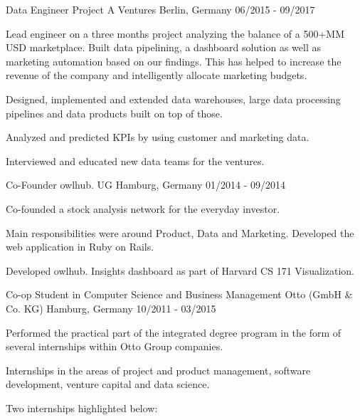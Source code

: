 \begin{cventries}
  \cventry
    {Data Engineer} %
    {Project A Ventures} %
    {Berlin, Germany} %
    {06/2015 - 09/2017} %
    {
      \begin{cvitems} %
        \item {Lead engineer on a three months project analyzing the balance of a 500+MM USD marketplace. Built data pipelining, a dashboard solution as well as marketing automation based on our findings. This has helped to increase the revenue of the company and intelligently allocate marketing budgets.}
        \item {Designed, implemented and extended data warehouses, large data processing pipelines and data products built on top of those.}
        \item {Analyzed and predicted KPIs by using customer and marketing data.}
        \item{Interviewed and educated new data teams for the ventures.}
      \end{cvitems}
    }

  \cventry
    {Co-Founder} %
    {owlhub. UG} %
    {Hamburg, Germany} %
    {01/2014 - 09/2014} %
    {
      \begin{cvitems} %
      \item{Co-founded a stock analysis network for the everyday investor.}
      \item{Main responsibilities were around Product, Data and Marketing. Developed the web application in Ruby on Rails.}
      \item{Developed owlhub. Insights dashboard as part of Harvard CS 171 Visualization.}
      \end{cvitems}
    }

  \cventry
    {Co-op Student in Computer Science and Business Management} %
    {Otto (GmbH \& Co. KG)} %
    {Hamburg, Germany} %
    {10/2011 - 03/2015} %
    {
      \begin{cvitems} %
        \item {Performed the practical part of the integrated degree program in the form of several internships within Otto Group companies.}
        \item {Internships in the areas of project and product management, software development, venture capital and data science.}
        \item{Two internships highlighted below:}
      \end{cvitems}
    }


\end{cventries}
